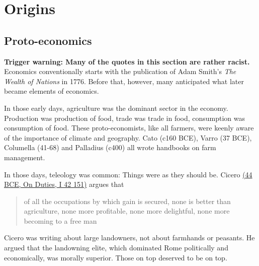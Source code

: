 \chapter{Origins}
\label{ch:origins}

\section{Proto-economics}
\textbf{Trigger warning: Many of the quotes in this section are rather racist.} \\

Economics conventionally starts with the publication of Adam Smith's \emph{The Wealth of Nations} in 1776. Before that, however, many anticipated what later became elements of economics.

In those early days, agriculture was the dominant sector in the economy. Production was production of food, trade was trade in food, consumption was consumption of food. These proto-economists, like all farmers, were keenly aware of the importance of climate and geography. Cato (c160 BCE), Varro (37 BCE), Columella (41-68) and Palladius (c400) all wrote handbooks on farm management. 

In those days, teleology was common: Things were as they should be. Cicero \href{https://penelope.uchicago.edu/Thayer/E/Roman/Texts/Cicero/de_Officiis/1E*.html}{(44 BCE, On Duties, I 42 151)} argues that
\begin{quote}
    of all the occupations by which gain is secured, none is better than agriculture, none more profitable, none more delightful, none more becoming to a free man
\end{quote}
Cicero was writing about large landowners, not about farmhands or peasants. He argued that the landowning elite, which dominated Rome politically and economically, was morally superior. Those on top deserved to be on top.

